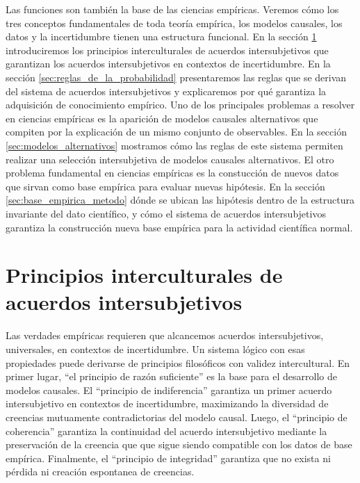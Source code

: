 \documentclass[a4paper,10pt]{book}
\theoremstyle{definition}
\begin{document}

Las funciones son tambi\'en la base de las ciencias emp\'iricas.
%
Veremos c\'omo los tres conceptos fundamentales de toda teor\'ia emp\'irica, los modelos causales, los datos y la incertidumbre tienen una estructura funcional.
%
En la secci\'on \ref{sec:principios_interculturales} introduciremos los principios interculturales de acuerdos intersubjetivos
que garantizan los acuerdos intersubjetivos en contextos de incertidumbre.
%
En la secci\'on \ref{sec:reglas_de_la_probabilidad} presentaremos las reglas que se derivan del sistema de acuerdos intersubjetivos y explicaremos por qu\'e garantiza la adquisici\'on de conocimiento emp\'irico.
%
Uno de los principales problemas a resolver en ciencias emp\'iricas es la aparici\'on de modelos causales alternativos que compiten por la explicaci\'on de un mismo conjunto de observables.
%
En la secci\'on \ref{sec:modelos_alternativos} mostramos c\'omo las reglas de este sistema permiten realizar una selecci\'on intersubjetiva de modelos causales alternativos.
%
El otro problema fundamental en ciencias emp\'iricas es la constucci\'on de nuevos datos que sirvan como base emp\'irica para evaluar nuevas hip\'otesis.
%
En la secci\'on \ref{sec:base_empirica_metodo} d\'onde se ubican las hip\'otesis dentro de la estructura invariante del dato cient\'ifico, y c\'omo el sistema de acuerdos intersubjetivos garantiza la construcci\'on nueva base emp\'irica para la actividad cient\'ifica normal.

\section{Principios interculturales de acuerdos intersubjetivos}\label{sec:principios_interculturales}

Las verdades emp\'iricas requieren que alcancemos acuerdos intersubjetivos, universales, en contextos de incertidumbre.
%
Un sistema l\'ogico con esas propiedades puede derivarse de principios filos\'oficos con validez intercultural.
%
En primer lugar, ``el principio de raz\'on suficiente'' es la base para el desarrollo de modelos causales.
%
El ``principio de indiferencia'' garantiza un primer acuerdo intersubjetivo en contextos de incertidumbre, maximizando la diversidad de creencias mutuamente contradictorias del modelo causal.
%
Luego, el ``principio de coherencia'' garantiza la continuidad del acuerdo intersubjetivo mediante la preservaci\'on de la creencia que que sigue siendo compatible con los datos de base emp\'irica.
%
Finalmente, el ``principio de integridad'' garantiza que no exista ni p\'erdida ni creaci\'on espontanea de creencias.
\end{document}
